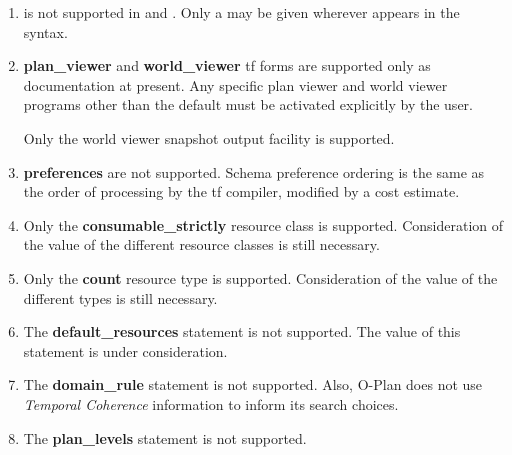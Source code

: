\begin{enumerate}

\item {} is not supported in  and
.  Only a  may be given wherever
 appears in the syntax.

\item {\bf plan\_viewer}
and {\bf world\_viewer}
{\sc tf} forms are supported only as documentation at present.
Any specific plan viewer and
world viewer programs other than the default must be activated explicitly by
the user.

Only the world viewer snapshot output facility is supported.

\item {\bf preferences} are not supported.  Schema preference ordering
is the same as the order of processing by the {\sc tf} compiler, modified
by a cost estimate.

\item Only the {\bf consumable\_strictly} resource class is supported. 
Consideration of the value of the different resource classes is still
necessary.

\item Only the {\bf count} resource type is supported.  Consideration of
the value of the different types is still necessary. 

\item The {\bf default\_resources} statement is not supported.  The
value of this statement is under consideration. 

\item The {\bf domain\_rule} statement is not supported.  Also, O-Plan
does not use {\em Temporal Coherence} information to inform its search
choices. 

\item The {\bf plan\_levels} statement is not supported.


\end{enumerate}
